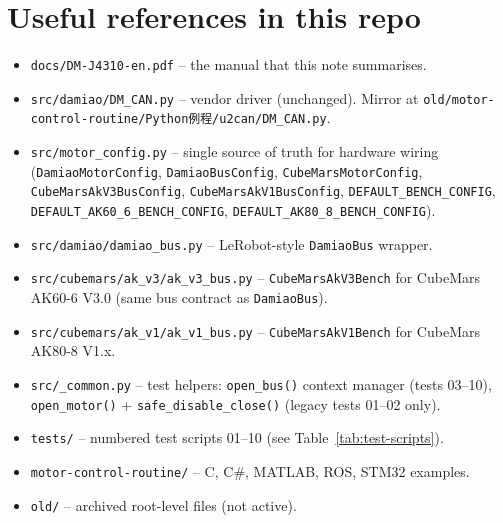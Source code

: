 \documentclass[11pt,a4paper]{article}
\begin{document}
\section{Useful references in this repo}
\begin{itemize}
  \item \texttt{docs/DM-J4310-en.pdf} -- the manual that this note summarises.
  \item \texttt{src/damiao/DM\_CAN.py} -- vendor driver (unchanged). Mirror at
        \texttt{old/motor-control-routine/Python例程/u2can/DM\_CAN.py}.
  \item \texttt{src/motor\_config.py} -- single source of truth for hardware
        wiring (\texttt{DamiaoMotorConfig}, \texttt{DamiaoBusConfig},
        \texttt{CubeMarsMotorConfig}, \texttt{CubeMarsAkV3BusConfig},
        \texttt{CubeMarsAkV1BusConfig},
        \texttt{DEFAULT\_BENCH\_CONFIG}, \texttt{DEFAULT\_AK60\_6\_BENCH\_CONFIG},
        \texttt{DEFAULT\_AK80\_8\_BENCH\_CONFIG}).
  \item \texttt{src/damiao/damiao\_bus.py} -- LeRobot-style \texttt{DamiaoBus} wrapper.
  \item \texttt{src/cubemars/ak\_v3/ak\_v3\_bus.py} -- \texttt{CubeMarsAkV3Bench}
        for CubeMars AK60-6 V3.0 (same bus contract as \texttt{DamiaoBus}).
  \item \texttt{src/cubemars/ak\_v1/ak\_v1\_bus.py} -- \texttt{CubeMarsAkV1Bench}
        for CubeMars AK80-8 V1.x.
  \item \texttt{src/\_common.py} -- test helpers: \texttt{open\_bus()} context
        manager (tests 03--10), \texttt{open\_motor()} + \texttt{safe\_disable\_close()}
        (legacy tests 01--02 only).
  \item \texttt{tests/} -- numbered test scripts 01--10 (see
        Table~\ref{tab:test-scripts}).
  \item \texttt{motor-control-routine/} -- C, C\#, MATLAB, ROS, STM32 examples.
  \item \texttt{old/} -- archived root-level files (not active).
\end{itemize}
\end{document}
